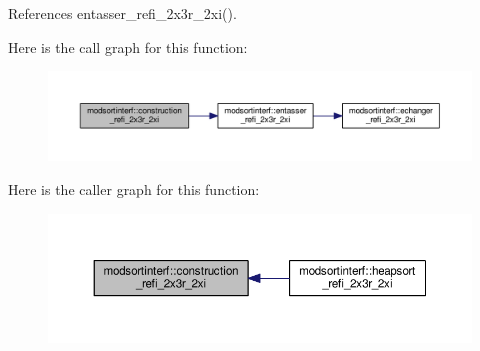 References entasser\+\_\+refi\+\_\+2x3r\+\_\+2xi().



Here is the call graph for this function\+:\nopagebreak
\begin{figure}[H]
\begin{center}
\leavevmode
\includegraphics[width=350pt]{namespacemodsortinterf_a36e0afef1ddbaec6e02812e1e6cf412f_cgraph}
\end{center}
\end{figure}




Here is the caller graph for this function\+:\nopagebreak
\begin{figure}[H]
\begin{center}
\leavevmode
\includegraphics[width=350pt]{namespacemodsortinterf_a36e0afef1ddbaec6e02812e1e6cf412f_icgraph}
\end{center}
\end{figure}


